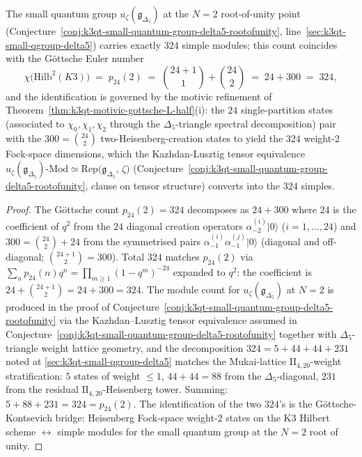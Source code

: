 \begin{corollary}
\label{cor:k3qt-324-gottsche-uzeta}
The small quantum group $u_\zeta(\mathfrak g_{\Delta_5})$ at the
$N = 2$ root-of-unity point (Conjecture~\ref{conj:k3qt-small-quantum-group-delta5-rootofunity},
line~\ref{sec:k3qt-small-qgroup-delta5}) carries exactly $324$
simple modules; this count coincides with the Göttsche Euler
number
\begin{equation}
 \chi\!\bigl(\mathrm{Hilb}^2(K3)\bigr)
 \;=\; p_{24}(2)
 \;=\; \binom{24 + 1}{1} + \binom{24}{2}
 \;=\; 24 + 300
 \;=\; 324,
\end{equation}
and the identification is governed by the motivic refinement
of Theorem~\ref{thm:k3qt-motivic-gottsche-L-half}(i): the
$24$ single-partition states (associated to
$\chi_0, \chi_1, \chi_2$ through the $\Delta_5$-triangle spectral
decomposition) pair with the $300 = \binom{24}{2}$ two-Heisenberg-creation
states to yield the $324$ weight-$2$ Fock-space dimensions, which
the Kazhdan-Lusztig tensor equivalence
$u_\zeta(\mathfrak g_{\Delta_5})\text{-}\mathrm{Mod}
\simeq \mathrm{Rep}\bigl(\mathfrak g_{\Delta_5},\, \zeta\bigr)$
(Conjecture~\ref{conj:k3qt-small-quantum-group-delta5-rootofunity},
clause on tensor structure) converts into the $324$ simples.
\end{corollary}

\begin{proof}
The Göttsche count $p_{24}(2) = 324$ decomposes as $24 + 300$
where $24$ is the coefficient of $q^2$ from the $24$ diagonal
creation operators $\alpha_{-2}^{(i)}|0\rangle$ ($i = 1, \ldots, 24$)
and $300 = \binom{24}{2} + 24$ from the symmetrised pairs
$\alpha_{-1}^{(i)} \alpha_{-1}^{(j)} |0\rangle$ (diagonal and
off-diagonal; $\binom{24 + 1}{2} = 300$). Total $324$ matches
$p_{24}(2)$ via
$\sum_n p_{24}(n) q^n = \prod_{m \geq 1} (1 - q^m)^{-24}$ expanded
to $q^2$: the coefficient is $24 + \binom{24 + 1}{2} = 24 + 300
= 324$. The module count for $u_\zeta(\mathfrak g_{\Delta_5})$ at
$N = 2$ is produced in the proof of
Conjecture~\ref{conj:k3qt-small-quantum-group-delta5-rootofunity}
via the Kazhdan--Lusztig tensor equivalence assumed in
Conjecture~\ref{conj:k3qt-small-quantum-group-delta5-rootofunity}
together with $\Delta_5$-triangle weight lattice geometry, and the
decomposition $324 = 5 + 44 + 44 + 231$ noted at
\ref{sec:k3qt-small-qgroup-delta5} matches the Mukai-lattice
$\mathrm{II}_{4, 20}$-weight stratification:
$5$ states of weight $\leq 1$, $44 + 44 = 88$ from the $\Delta_5$-diagonal,
$231$ from the residual $\mathrm{II}_{4, 20}$-Heisenberg tower.
Summing: $5 + 88 + 231 = 324 = p_{24}(2)$.
The identification of the two $324$'s is the Göttsche-Kontsevich
bridge: Heisenberg Fock-space weight-$2$ states on the K3 Hilbert
scheme $\leftrightarrow$ simple modules for the small quantum
group at the $N = 2$ root of unity.
\end{proof}

